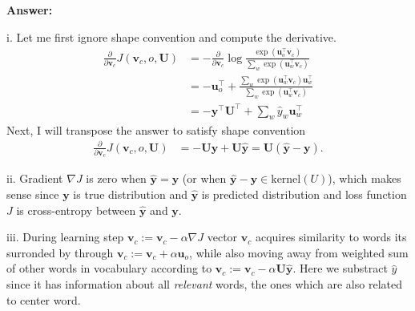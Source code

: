 \documentclass{article}
\newenvironment{answer}{
    {\bf Answer:} \sf \begingroup\color{red}
}{\endgroup}%
\begin{document}
\begin{enumerate}[label=(\alph*)]
\begin{enumerate}[label=(\roman*)]
\end{enumerate}

\begin{shaded}
\begin{answer}
i. Let me first ignore shape convention and compute the derivative.
\begin{align}
	\frac{\partial }{\partial \bm v_c} J(\bm v_c, o, \bm U)
	&= -\frac{\partial }{\partial \bm v_c} \log \frac{\exp(\bm u_{o}^\top \bm v_c)}{\sum_{w} \exp(\bm u_{w}^\top \bm v_c)} \\
	&= -\bm u_{o}^\top +  \frac{\sum_{w} \exp(\bm u_{w}^\top \bm v_c) \bm u_{w}^\top}{\sum_{w} \exp(\bm u_{w}^\top \bm v_c)} \\
	&= -\bm y^\top \bm U^\top + \sum_w \hat{y}_w \bm u_{w}^\top 
\end{align}
Next, I will transpose the answer to satisfy shape convention
\begin{align}
	\frac{\partial }{\partial \bm v_c} J(\bm v_c, o, \bm U)
	&= -\bm U \bm y + \bm U \hat{\bm y}
	= \bm U \left( \hat{\bm y} - \bm y \right).
\end{align}

ii. Gradient $\nabla J$ is zero when $\hat{\bm y} = \bm y$ (or when $\hat{\bm y}-\bm y \in \text{kernel}(U)$), which makes sense since $\bm y$ is true distribution and $\hat{\bm y}$ is predicted distribution and loss function $J$ is cross-entropy between $\hat{\bm y}$ and $\bm y$. 


iii. During learning step $\bm v_c := \bm v_c - \alpha \nabla J$ vector $\bm v_c$ acquires similarity to words its surronded by through $\bm v_c := \bm v_c + \alpha \bm u_o$, while also moving away from weighted sum of other words in vocabulary according to $\bm v_c := \bm v_c - \alpha \bm U \hat{\bm y}$. Here we substract $\hat{y}$ since it has information about all \emph{relevant} words, the ones which are also related to center word. 
\end{answer}
\end{shaded}



\end{enumerate}
\end{document}
